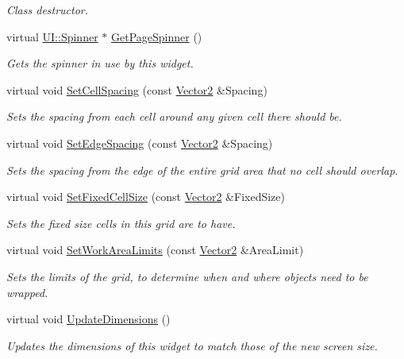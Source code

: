 \begin{DoxyCompactItemize}
\begin{DoxyCompactList}\small\item\em Class destructor. \item\end{DoxyCompactList}\item 
virtual \hyperlink{classMezzanine_1_1UI_1_1Spinner}{UI::Spinner} $\ast$ \hyperlink{classMezzanine_1_1UI_1_1PagedCellGrid_a0478eb61f08e9bdea6a239175b52b0dc}{GetPageSpinner} ()
\begin{DoxyCompactList}\small\item\em Gets the spinner in use by this widget. \item\end{DoxyCompactList}\item 
virtual void \hyperlink{classMezzanine_1_1UI_1_1PagedCellGrid_aadf28fcff9f6ebab1ab86ecbbdb73159}{SetCellSpacing} (const \hyperlink{classMezzanine_1_1Vector2}{Vector2} \&Spacing)
\begin{DoxyCompactList}\small\item\em Sets the spacing from each cell around any given cell there should be. \item\end{DoxyCompactList}\item 
virtual void \hyperlink{classMezzanine_1_1UI_1_1PagedCellGrid_a79b32a3ab8f2df66be181730710e76ae}{SetEdgeSpacing} (const \hyperlink{classMezzanine_1_1Vector2}{Vector2} \&Spacing)
\begin{DoxyCompactList}\small\item\em Sets the spacing from the edge of the entire grid area that no cell should overlap. \item\end{DoxyCompactList}\item 
virtual void \hyperlink{classMezzanine_1_1UI_1_1PagedCellGrid_a32cdd1fc050fb926db8bdd03d419841e}{SetFixedCellSize} (const \hyperlink{classMezzanine_1_1Vector2}{Vector2} \&FixedSize)
\begin{DoxyCompactList}\small\item\em Sets the fixed size cells in this grid are to have. \item\end{DoxyCompactList}\item 
virtual void \hyperlink{classMezzanine_1_1UI_1_1PagedCellGrid_ad5cf298943ad2e8517d7660bffbe5744}{SetWorkAreaLimits} (const \hyperlink{classMezzanine_1_1Vector2}{Vector2} \&AreaLimit)
\begin{DoxyCompactList}\small\item\em Sets the limits of the grid, to determine when and where objects need to be wrapped. \item\end{DoxyCompactList}\item 
virtual void \hyperlink{classMezzanine_1_1UI_1_1PagedCellGrid_a1ff79a778710a517abb5c55a13b6a273}{UpdateDimensions} ()
\begin{DoxyCompactList}\small\item\em Updates the dimensions of this widget to match those of the new screen size. \item\end{DoxyCompactList}\end{DoxyCompactItemize}
